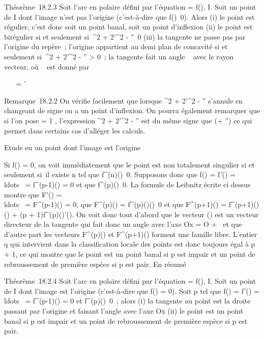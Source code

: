 \documentclass[]{article}
\begin{document}
Théorème~18.2.3 Soit \Gamma l'arc en polaire défini par l'équation \rho = f(\theta),
\theta \in I. Soit \theta un point de I dont l'image n'est pas l'origine
(c'est-à-dire que f(\theta)\neq~0). Alors (i) le point
est régulier, c'est donc soit un point banal, soit un point d'inflexion
(ii) le point est birégulier si et seulement si~\rho^2 +
2\rho'^2 - \rho\rho''\neq~0 (iii) la tangente
ne passe pas par l'origine du repère~; l'origine appartient au demi plan
de concavité si et seulement si~\rho^2 + 2\rho'^2 - \rho\rho''
> 0~; la tangente fait un angle \alpha~ avec le rayon vecteur, où
\alpha~ est donné par

\mathrmtg~ \alpha~ = \rho
\over \rho'

Remarque~18.2.2 On vérifie facilement que lorsque \rho^2 +
2\rho'^2 - \rho\rho'' s'annule en changeant de signe on a un point
d'inflexion. On pourra également remarquer que si l'on pose \phi = 1
\over \rho , l'expression \rho^2 +
2\rho'^2 - \rho\rho'' est du même signe que \phi(\phi + \phi'') ce qui permet
dans certains cas d'alléger les calculs.

Etude en un point dont l'image est l'origine

Si f(\theta) = 0, on voit immédiatement que le point est non totalement
singulier si et seulement si~il existe n tel que
f^(n)(\theta)\neq~0. Supposons donc que
f(\theta) = f'(\theta) =
\\ldots~ =
f^(p-1)(\theta) = 0 et que
f^(p)(\theta)\neq~0. La formule de Leibnitz
écrite ci dessus montre que F'(\theta) =
\\ldots~ =
F^(p-1)(\theta) = 0, que F^(p)(\theta) =
f^(p)(\theta)\vecu(\theta)\neq~0
et que F^(p+1)(\theta) =
f^(p+1)(\theta)\vecu(\theta) + (p +
1)f^(p)(\theta)\vecu'(\theta). On voit donc tout
d'abord que le vecteur \vecu(\theta) est un vecteur
directeur de la tangente qui fait donc un angle \theta avec l'axe Ox = O +
~\vec\imath et que d'autre part les vecteurs
F^(p)(\theta) et F^(p+1)(\theta) forment une famille libre.
L'entier q qui intervient dans la classification locale des points est
donc toujours égal à p + 1, ce qui montre que le point est un point
banal si p est impair et un point de rebroussement de première espèce si
p est pair. En résumé

Théorème~18.2.4 Soit \Gamma l'arc en polaire défini par l'équation \rho = f(\theta),
\theta \in I. Soit \theta un point de I dont l'image est l'origine (c'est-à-dire que
f(\theta) = 0). Soit p tel que f(\theta) = f'(\theta) =
\\ldots~ =
f^(p-1)(\theta) = 0 et
f^(p)(\theta)\neq~0~; alors (i) la tangente
au point \theta est la droite passant par l'origine et faisant l'angle \theta avec
l'axe Ox (ii) le point est un point banal si p est impair et un point de
rebroussement de première espèce si p est pair.
\end{document}
